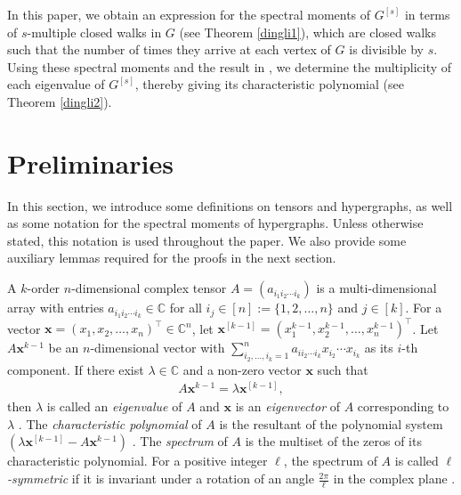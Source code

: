 \documentclass{article}
\begin{document}
In this paper,
we obtain an expression for the spectral moments of $G^{[s]}$ in terms of $s$-multiple closed walks in $G$ (see Theorem \ref{dingli1}),
which are closed walks such that the number of times they arrive at each vertex of $G$ is divisible by $s$.
Using these spectral moments and the result in \cite{lin2026eigenvalue},
we determine the multiplicity of each eigenvalue of $G^{[s]}$,
thereby giving its characteristic polynomial (see Theorem \ref{dingli2}).

\section{Preliminaries}

In this section,
we introduce some definitions on tensors and hypergraphs,
as well as some notation for the spectral moments of hypergraphs.
Unless otherwise stated,
this notation is used throughout the paper.
We also provide some auxiliary lemmas required for the proofs in the next section.

A $k$-order $n$-dimensional complex tensor $A=(a_{i_{1}i_{2}\cdots i_{k}})$ is a multi-dimensional array with entries $a_{i_{1}i_{2}\cdots i_{k}}\in\mathbb{C}$ for all $i_{j}\in[n]:=\{1,2,\ldots,n\}$ and $j\in[k]$.
For a vector $\mathbf{x}=(x_{1},x_{2},\ldots,x_{n})^{\top}\in\mathbb{C}^{n}$,
let $\mathbf{x}^{[k-1]}=(x_{1}^{k-1},x_{2}^{k-1},\ldots,x_{n}^{k-1})^{\top}$.
Let $A\mathbf{x}^{k-1}$ be an $n$-dimensional vector with $\sum_{i_{2},\ldots,i_{k}=1}^{n}a_{ii_{2}\cdots i_{k}}x_{i_{2}}\cdots x_{i_{k}}$ as its $i$-th component.
If there exist $\lambda\in\mathbb{C}$ and a non-zero vector $\mathbf{x}$ such that
\begin{align*}
A\mathbf{x}^{k-1}=\lambda\mathbf{x}^{[k-1]},
\end{align*}
then $\lambda$ is called an \emph{eigenvalue} of $A$ and $\mathbf{x}$ is an \emph{eigenvector} of $A$ corresponding to $\lambda$ \cite{lim2005singular,qi2005eigenvalues}.
The \emph{characteristic polynomial} of $A$ is the resultant of the polynomial system $(\lambda\mathbf{x}^{[k-1]}-A\mathbf{x}^{k-1})$ \cite{qi2005eigenvalues}.
The \emph{spectrum} of $A$ is the multiset of the zeros of its characteristic polynomial.
For a positive integer $\ell$,
the spectrum of $A$ is called \emph{$\ell$-symmetric} if it is invariant under a rotation of an angle $\frac{2\pi}{\ell}$ in the complex plane \cite{cooper2012spectra}.

\end{document}

